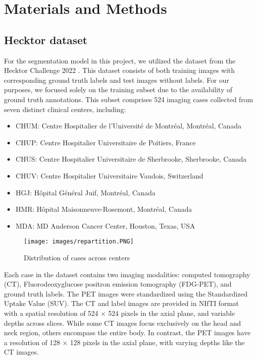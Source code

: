 \chapter{Materials and Methods}
\section{Hecktor dataset}
For the segmentation model in this project, we utilized the dataset from the Hecktor Challenge 2022 \cite{Hecktor2022}. This dataset consists of both training images with corresponding ground truth labels and test images without labels. For our purposes, we focused solely on the training subset due to the availability of ground truth annotations. This subset comprises 524 imaging cases collected from seven distinct clinical centers, including:

\begin{itemize}
    \setlength\itemsep{1pt}
    \setlength\parskip{0pt}
    \setlength\topsep{0pt}
    \item CHUM: Centre Hospitalier de l’Université de Montréal, Montréal, Canada
    \item CHUP: Centre Hospitalier Universitaire de Poitiers, France
    \item CHUS: Centre Hospitalier Universitaire de Sherbrooke, Sherbrooke, Canada
    \item CHUV: Centre Hospitalier Universitaire Vaudois, Switzerland
    \item HGJ: Hôpital Général Juif, Montréal, Canada
    \item HMR: Hôpital Maisonneuve-Rosemont, Montréal, Canada
    \item MDA: MD Anderson Cancer Center, Houston, Texas, USA
\end{itemize}
\begin{figure}[ht]
    \centering
    \texttt{[image: images/repartition.PNG]}
    \caption{Distribution of cases across centers}
\end{figure}
\newpage
Each case in the dataset contains two imaging modalities: computed tomography (CT), Fluorodeoxyglucose positron emission tomography (FDG-PET), and ground truth labels. The PET images were standardized using the Standardized Uptake Value (SUV). The CT and label images are provided in NIfTI format with a spatial resolution of 524 × 524 pixels in the axial plane, and variable depths across slices. While some CT images focus exclusively on the head and neck region, others encompass the entire body. In contrast, the PET images have a resolution of 128 × 128 pixels in the axial plane, with varying depths like the CT images.

